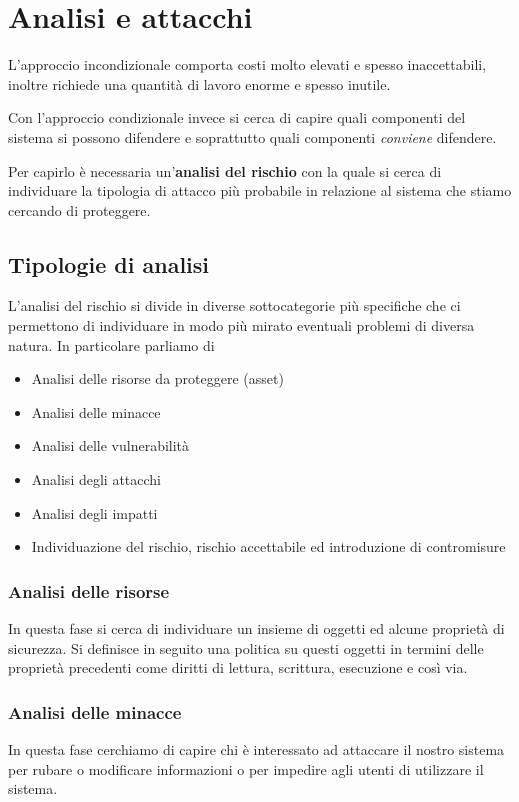 \chapter{Analisi e attacchi}
L'approccio incondizionale comporta costi molto elevati e spesso inaccettabili, inoltre richiede una quantità di lavoro
enorme e spesso inutile.

Con l'approccio condizionale invece si cerca di capire quali componenti del sistema si possono difendere e soprattutto
quali componenti \emph{conviene} difendere.

Per capirlo è necessaria un'\textbf{analisi del rischio} con la quale si cerca di individuare la tipologia di attacco
più probabile in relazione al sistema che stiamo cercando di proteggere.

\section{Tipologie di analisi}
L'analisi del rischio si divide in diverse sottocategorie più specifiche che ci permettono di individuare in modo più
mirato eventuali problemi di diversa natura. In particolare parliamo di
\begin{itemize}
	\item Analisi delle risorse da proteggere (asset)
	\item Analisi delle minacce
	\item Analisi delle vulnerabilità
	\item Analisi degli attacchi
	\item Analisi degli impatti
	\item Individuazione del rischio, rischio accettabile ed introduzione di contromisure
\end{itemize}

\subsection{Analisi delle risorse}
In questa fase si cerca di individuare un insieme di oggetti ed alcune proprietà di sicurezza. Si definisce in seguito
una politica su questi oggetti in termini delle proprietà precedenti come diritti di lettura, scrittura, esecuzione
e così via.

\subsection{Analisi delle minacce}
In questa fase cerchiamo di capire chi è interessato ad attaccare il nostro sistema per rubare o modificare informazioni
o per impedire agli utenti di utilizzare il sistema.

